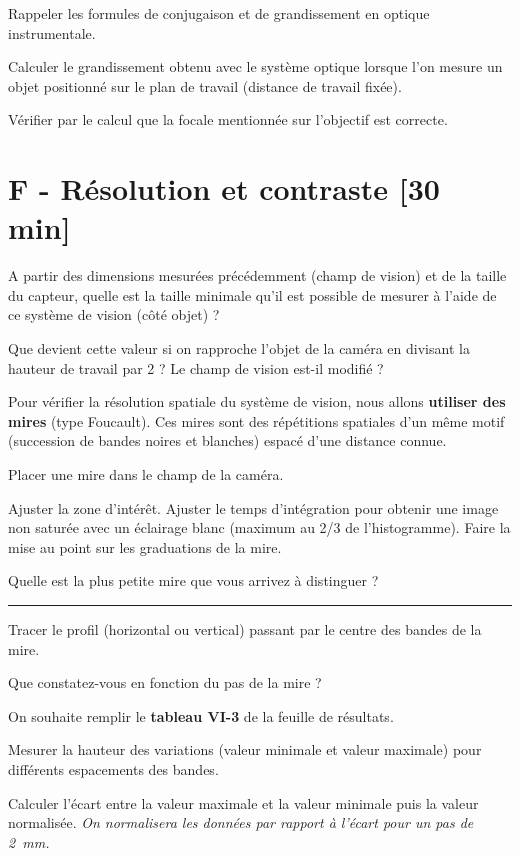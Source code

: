 \Quest Rappeler les formules de conjugaison et de grandissement en optique instrumentale.

\Quest Calculer le grandissement obtenu avec le système optique lorsque l'on mesure un objet positionné sur le plan de travail (distance de travail fixée).

\Quest Vérifier par le calcul que la focale mentionnée sur l'objectif est correcte.

\section{F - Résolution et contraste {[30 min]}}

\Quest A partir des dimensions mesurées précédemment (champ de vision) et de la taille du capteur, quelle est la taille minimale qu'il est possible de mesurer à l'aide de ce système de vision (côté objet) ?

\Quest Que devient cette valeur si on rapproche l'objet de la caméra en divisant la hauteur de travail par 2 ? Le champ de vision est-il modifié ?

\medskip

Pour vérifier la résolution spatiale du système de vision, nous allons \textbf{utiliser des mires} (type Foucault). Ces mires sont des répétitions spatiales d'un même motif (succession de bandes noires et blanches) espacé d'une distance connue.

\Manip Placer une mire dans le champ de la caméra.

\Manip Ajuster la zone d'intérêt. Ajuster le temps d'intégration pour obtenir une image non saturée avec un éclairage blanc (maximum au 2/3 de l'histogramme). Faire la mise au point sur les graduations de la mire.

\Quest Quelle est la plus petite mire que vous arrivez à distinguer ?

\noindent \rule{\linewidth}{1pt}

\Manip Tracer le profil (horizontal ou vertical) passant par le centre des bandes de la mire.

\Quest Que constatez-vous en fonction du pas de la mire ?

On souhaite remplir le \textbf{tableau VI-3} de la feuille de résultats.

\Manip Mesurer la hauteur des variations (valeur minimale et valeur maximale) pour différents espacements des bandes.

\Manip Calculer l'écart entre la valeur maximale et la valeur minimale puis la valeur normalisée. \textit{On normalisera les données par rapport à l'écart pour un pas de 2~mm.}

